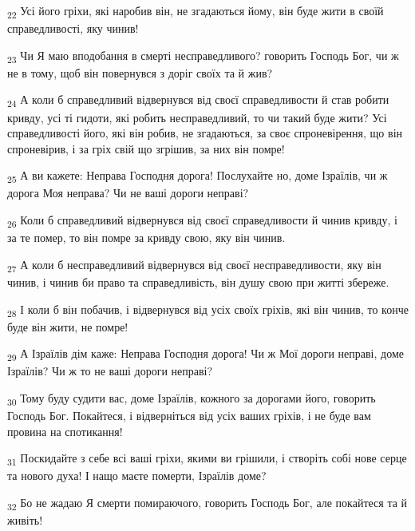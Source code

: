 \begin{tcolorbox}
\textsubscript{22} Усі його гріхи, які наробив він, не згадаються йому, він буде жити в своїй справедливості, яку чинив!
\end{tcolorbox}
\begin{tcolorbox}
\textsubscript{23} Чи Я маю вподобання в смерті несправедливого? говорить Господь Бог, чи ж не в тому, щоб він повернувся з доріг своїх та й жив?
\end{tcolorbox}
\begin{tcolorbox}
\textsubscript{24} А коли б справедливий відвернувся від своєї справедливости й став робити кривду, усі ті гидоти, які робить несправедливий, то чи такий буде жити? Усі справедливості його, які він робив, не згадаються, за своє спроневірення, що він спроневірив, і за гріх свій що згрішив, за них він помре!
\end{tcolorbox}
\begin{tcolorbox}
\textsubscript{25} А ви кажете: Неправа Господня дорога! Послухайте но, доме Ізраїлів, чи ж дорога Моя неправа? Чи не ваші дороги неправі?
\end{tcolorbox}
\begin{tcolorbox}
\textsubscript{26} Коли б справедливий відвернувся від своєї справедливости й чинив кривду, і за те помер, то він помре за кривду свою, яку він чинив.
\end{tcolorbox}
\begin{tcolorbox}
\textsubscript{27} А коли б несправедливий відвернувся від своєї несправедливости, яку він чинив, і чинив би право та справедливість, він душу свою при житті збереже.
\end{tcolorbox}
\begin{tcolorbox}
\textsubscript{28} І коли б він побачив, і відвернувся від усіх своїх гріхів, які він чинив, то конче буде він жити, не помре!
\end{tcolorbox}
\begin{tcolorbox}
\textsubscript{29} А Ізраїлів дім каже: Неправа Господня дорога! Чи ж Мої дороги неправі, доме Ізраїлів? Чи ж то не ваші дороги неправі?
\end{tcolorbox}
\begin{tcolorbox}
\textsubscript{30} Тому буду судити вас, доме Ізраїлів, кожного за дорогами його, говорить Господь Бог. Покайтеся, і відверніться від усіх ваших гріхів, і не буде вам провина на спотикання!
\end{tcolorbox}
\begin{tcolorbox}
\textsubscript{31} Поскидайте з себе всі ваші гріхи, якими ви грішили, і створіть собі нове серце та нового духа! І нащо маєте померти, Ізраїлів доме?
\end{tcolorbox}
\begin{tcolorbox}
\textsubscript{32} Бо не жадаю Я смерти помираючого, говорить Господь Бог, але покайтеся та й живіть!
\end{tcolorbox}
